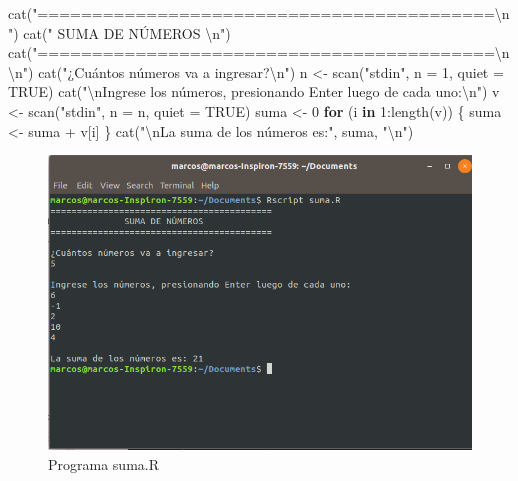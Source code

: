 \documentclass[
]{book}
\newenvironment{Shaded}{\begin{snugshade}}{\end{snugshade}}
\newcommand{\AttributeTok}[1]{\textcolor[rgb]{0.77,0.63,0.00}{#1}}
\newcommand{\ConstantTok}[1]{\textcolor[rgb]{0.00,0.00,0.00}{#1}}
\newcommand{\ControlFlowTok}[1]{\textcolor[rgb]{0.13,0.29,0.53}{\textbf{#1}}}
\newcommand{\DecValTok}[1]{\textcolor[rgb]{0.00,0.00,0.81}{#1}}
\newcommand{\FunctionTok}[1]{\textcolor[rgb]{0.00,0.00,0.00}{#1}}
\newcommand{\NormalTok}[1]{#1}
\newcommand{\OtherTok}[1]{\textcolor[rgb]{0.56,0.35,0.01}{#1}}
\newcommand{\SpecialCharTok}[1]{\textcolor[rgb]{0.00,0.00,0.00}{#1}}
\newcommand{\StringTok}[1]{\textcolor[rgb]{0.31,0.60,0.02}{#1}}
\begin{document}
\begin{Shaded}
\begin{Highlighting}[]
\FunctionTok{cat}\NormalTok{(}\StringTok{"==========================================}\SpecialCharTok{\textbackslash{}n}\StringTok{"}\NormalTok{)}
\FunctionTok{cat}\NormalTok{(}\StringTok{"              SUMA DE NÚMEROS             }\SpecialCharTok{\textbackslash{}n}\StringTok{"}\NormalTok{)}
\FunctionTok{cat}\NormalTok{(}\StringTok{"==========================================}\SpecialCharTok{\textbackslash{}n\textbackslash{}n}\StringTok{"}\NormalTok{)}
\FunctionTok{cat}\NormalTok{(}\StringTok{"¿Cuántos números va a ingresar?}\SpecialCharTok{\textbackslash{}n}\StringTok{"}\NormalTok{)}
\NormalTok{n }\OtherTok{\textless{}{-}} \FunctionTok{scan}\NormalTok{(}\StringTok{"stdin"}\NormalTok{, }\AttributeTok{n =} \DecValTok{1}\NormalTok{, }\AttributeTok{quiet =} \ConstantTok{TRUE}\NormalTok{)}
\FunctionTok{cat}\NormalTok{(}\StringTok{"}\SpecialCharTok{\textbackslash{}n}\StringTok{Ingrese los números, presionando Enter luego de cada uno:}\SpecialCharTok{\textbackslash{}n}\StringTok{"}\NormalTok{)}
\NormalTok{v }\OtherTok{\textless{}{-}} \FunctionTok{scan}\NormalTok{(}\StringTok{"stdin"}\NormalTok{, }\AttributeTok{n =}\NormalTok{ n, }\AttributeTok{quiet =} \ConstantTok{TRUE}\NormalTok{)}
\NormalTok{suma }\OtherTok{\textless{}{-}} \DecValTok{0}
\ControlFlowTok{for}\NormalTok{ (i }\ControlFlowTok{in} \DecValTok{1}\SpecialCharTok{:}\FunctionTok{length}\NormalTok{(v)) \{}
\NormalTok{    suma }\OtherTok{\textless{}{-}}\NormalTok{ suma }\SpecialCharTok{+}\NormalTok{ v[i]}
\NormalTok{\}}
\FunctionTok{cat}\NormalTok{(}\StringTok{"}\SpecialCharTok{\textbackslash{}n}\StringTok{La suma de los números es:"}\NormalTok{, suma, }\StringTok{"}\SpecialCharTok{\textbackslash{}n}\StringTok{"}\NormalTok{)}
\end{Highlighting}
\end{Shaded}

\begin{figure}

{\centering \includegraphics[width=0.8\linewidth]{images/07_otros/consola4} 

}

\caption{Programa suma.R}\label{fig:unnamed-chunk-204}
\end{figure}
\end{document}
